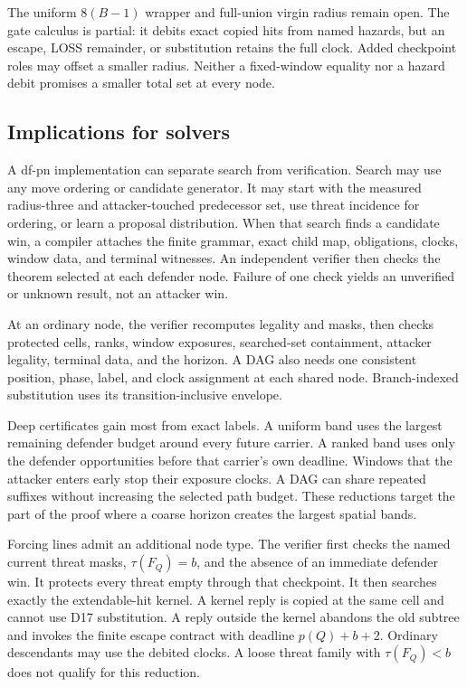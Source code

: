 The uniform $8(B-1)$ wrapper and full-union virgin radius remain open.  The
gate calculus is partial: it debits exact copied hits from named hazards, but
an escape, LOSS remainder, or substitution retains the full clock.  Added
checkpoint roles may offset a smaller radius.  Neither a fixed-window equality
nor a hazard debit promises a smaller total set at every node.

\subsection{Implications for solvers}

A df-pn implementation can separate search from verification.  Search may
use any move ordering or candidate generator.  It may start with the measured
radius-three and attacker-touched predecessor set, use threat incidence for
ordering, or learn a proposal distribution.  When that search finds a
candidate win, a compiler attaches the finite grammar, exact child map,
obligations, clocks, window data, and terminal witnesses.  An independent
verifier then checks the theorem selected at each defender node.  Failure of
one check yields an unverified or unknown result, not an attacker win.

At an ordinary node, the verifier recomputes legality and masks, then checks
protected cells, ranks, window exposures, searched-set containment, attacker
legality, terminal data, and the horizon.  A DAG also needs one consistent
position, phase, label, and clock assignment at each shared node.
Branch-indexed substitution uses its transition-inclusive envelope.

Deep certificates gain most from exact labels.  A uniform band uses the
largest remaining defender budget around every future carrier.  A ranked band
uses only the defender opportunities before that carrier's own deadline.
Windows that the attacker enters early stop their exposure clocks.  A DAG can
share repeated suffixes without increasing the selected path budget.  These
reductions target the part of the proof where a coarse horizon creates the
largest spatial bands.

Forcing lines admit an additional node type.  The verifier first checks the
named current threat masks, $\tau(F_Q)=b$, and the absence of an immediate
defender win.  It protects every threat empty through that checkpoint.  It
then searches exactly the extendable-hit kernel.  A kernel reply is copied at
the same cell and cannot use D17 substitution.  A reply outside the kernel
abandons the old subtree and invokes the finite escape contract with deadline
$p(Q)+b+2$.  Ordinary descendants may use the debited clocks.  A loose threat
family with $\tau(F_Q)<b$ does not qualify for this reduction.

